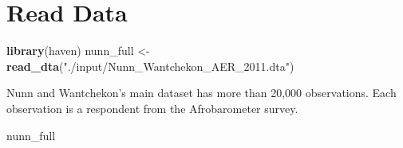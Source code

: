 \documentclass[]{book}
\newenvironment{Shaded}{\begin{snugshade}}{\end{snugshade}}
\newcommand{\KeywordTok}[1]{\textcolor[rgb]{0.13,0.29,0.53}{\textbf{#1}}}
\newcommand{\StringTok}[1]{\textcolor[rgb]{0.31,0.60,0.02}{#1}}
\newcommand{\NormalTok}[1]{#1}
\theoremstyle{definition}
\theoremstyle{definition}
\theoremstyle{definition}
\theoremstyle{remark}
\begin{document}
\section{Read Data}\label{read-data-1}

\begin{Shaded}
\begin{Highlighting}[]
\KeywordTok{library}\NormalTok{(haven)}
\NormalTok{nunn_full <-}\StringTok{ }\KeywordTok{read_dta}\NormalTok{(}\StringTok{"./input/Nunn_Wantchekon_AER_2011.dta"}\NormalTok{)}
\end{Highlighting}
\end{Shaded}

Nunn and Wantchekon's main dataset has more than 20,000 observations.
Each observation is a respondent from the Afrobarometer survey.

\begin{Shaded}
\begin{Highlighting}[]
\NormalTok{nunn_full}
\end{Highlighting}
\end{Shaded}
\end{document}
